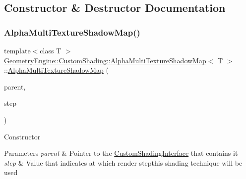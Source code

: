 \subsection{Constructor \& Destructor Documentation}
\mbox{\label{class_geometry_engine_1_1_custom_shading_1_1_alpha_multi_texture_shadow_map_aa6616681ccdc61e9ad0e8996a80c0f1e}} 
\subsubsection{\texorpdfstring{AlphaMultiTextureShadowMap()}{AlphaMultiTextureShadowMap()}\hspace{0.1cm}{\footnotesize\ttfamily [1/2]}}
{\footnotesize\ttfamily template$<$class T $>$ \\
\mbox{\hyperlink{class_geometry_engine_1_1_custom_shading_1_1_alpha_multi_texture_shadow_map}{Geometry\+Engine\+::\+Custom\+Shading\+::\+Alpha\+Multi\+Texture\+Shadow\+Map}}$<$ T $>$\+::\mbox{\hyperlink{class_geometry_engine_1_1_custom_shading_1_1_alpha_multi_texture_shadow_map}{Alpha\+Multi\+Texture\+Shadow\+Map}} (\begin{DoxyParamCaption}\item[{\mbox{\hyperlink{class_geometry_engine_1_1_custom_shading_1_1_custom_shading_interface}{Custom\+Shading\+Interface}} $\ast$}]{parent,  }\item[{\mbox{\hyperlink{namespace_geometry_engine_1_1_custom_shading_a2dc236a5b567da5099069ce2b2be5609}{Custom\+Shading\+Steps}}}]{step }\end{DoxyParamCaption})\hspace{0.3cm}{\ttfamily [inline]}}

Constructor 
\begin{DoxyParams}{Parameters}
{\em parent} & Pointer to the \mbox{\hyperlink{class_geometry_engine_1_1_custom_shading_1_1_custom_shading_interface}{Custom\+Shading\+Interface}} that contains it \\
\hline
{\em step} & Value that indicates at which render stepthis shading technique will be used \\
\hline
\end{DoxyParams}
\mbox{\label{class_geometry_engine_1_1_custom_shading_1_1_alpha_multi_texture_shadow_map_ab099c9b9c3aab8ef5e2448b9aebe0f78}} 
